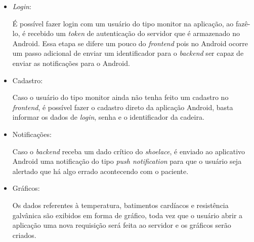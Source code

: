 \begin{itemize}

\item \textit{Login}:

É possível fazer login com um usuário do tipo monitor na aplicação, ao fazê-lo, é recebido um
\textit{token} de autenticação do servidor que é armazenado no Android. Essa etapa se difere
um pouco do \textit{frontend} pois no Android ocorre um passo adicional de enviar um
identificador para o \textit{backend} ser capaz de enviar as notificações para o Android.

\item Cadastro:

Caso o usuário do tipo monitor ainda não tenha feito um cadastro no \textit{frontend}, é
possível fazer o cadastro direto da aplicação Android, basta informar os dados de 
\textit{login}, senha e o identificador da cadeira.

\item Notificações:

Caso o \textit{backend} receba um dado crítico do \textit{shoelace}, é enviado ao aplicativo
Android uma notificação do tipo \textit{push notification} para que o usuário seja alertado
que há algo errado acontecendo com o paciente.

\item Gráficos:

Os dados referentes à temperatura, batimentos cardíacos e resistência galvânica são exibidos
em forma de gráfico, toda vez que o usuário abrir a aplicação uma nova requisição será feita
ao servidor e os gráficos serão criados.



\end{itemize}
